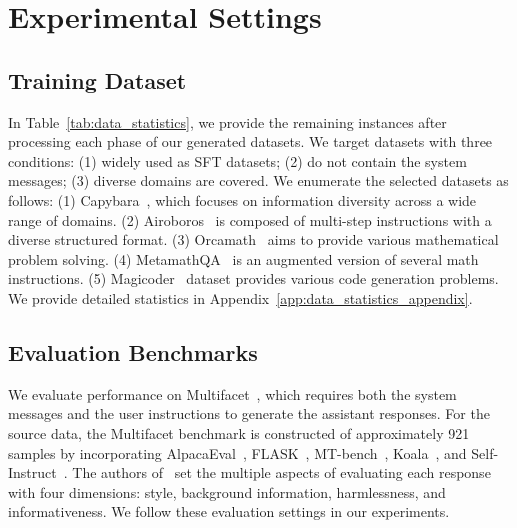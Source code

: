 \section{Experimental Settings}




\subsection{Training Dataset}
In Table~\ref{tab:data_statistics}, we provide the remaining instances after processing each phase of our generated datasets.
We target datasets with three conditions: (1) widely used as SFT datasets; (2) do not contain the system messages; (3) diverse domains are covered. 
We enumerate the selected datasets as follows: 
(1) Capybara~\citep{daniele2023amplify-instruct}, which focuses on information diversity across a wide range of domains.
(2) Airoboros~\citep{airoboros3.1} is composed of multi-step instructions with a diverse structured format.
(3) Orcamath~\citep{mitra2024orcamath} aims to provide various mathematical problem solving.
(4) MetamathQA~\citep{yu2023metamath} is an augmented version of several math instructions.
(5) Magicoder~\citep{luo2023wizardcoder} dataset provides various code generation problems.
We provide detailed statistics in Appendix~\ref{app:data_statistics_appendix}.




\subsection{Evaluation Benchmarks}
We evaluate performance on  Multifacet~\citep{lee2024aligning}, which requires both the system messages and the user instructions to generate the assistant responses.
For the source data, the Multifacet benchmark is constructed of approximately 921 samples by incorporating AlpacaEval~\citep{dubois2024length}, FLASK~\citep{ye2023flask}, MT-bench~\citep{bai2024mt}, Koala~\citep{koala_blogpost_2023}, and Self-Instruct~\citep{wang2022self}.
The authors of~\citet{lee2024aligning} set the multiple aspects of evaluating each response with four dimensions: style, background information, harmlessness, and informativeness.
We follow these evaluation settings in our experiments.

